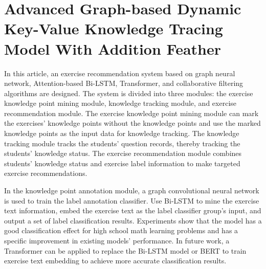 \chapter{Advanced Graph-based Dynamic Key-Value Knowledge Tracing Model With Addition Feather}
In this article, an exercise recommendation system based on graph neural network, Attention-based Bi-LSTM, Transformer, and collaborative filtering algorithms are designed. The system is divided into three modules: the exercise knowledge point mining module, knowledge tracking module, and exercise recommendation module. The exercise knowledge point mining module can mark the exercises' knowledge points without the knowledge points and use the marked knowledge points as the input data for knowledge tracking. The knowledge tracking module tracks the students' question records, thereby tracking the students' knowledge status. The exercise recommendation module combines students' knowledge status and exercise label information to make targeted exercise recommendations.


In the knowledge point annotation module, a graph convolutional neural network is used to train the label annotation classifier. Use Bi-LSTM to mine the exercise text information, embed the exercise text as the label classifier group's input, and output a set of label classification results. Experiments show that the model has a good classification effect for high school math learning problems and has a specific improvement in existing models' performance. In future work, a Transformer can be applied to replace the Bi-LSTM model or BERT to train exercise text embedding to achieve more accurate classification results.


